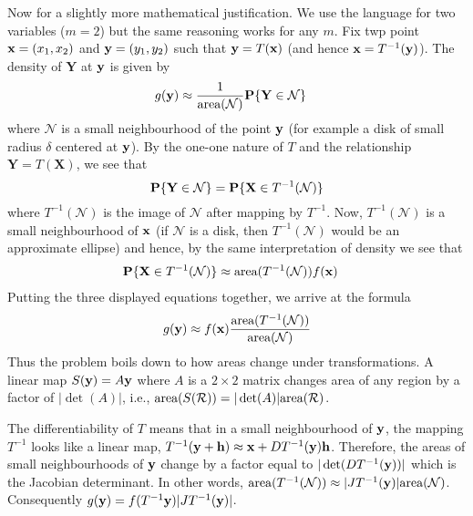 \documentclass[preprint,  11pt]{amsart}
\def\h{{\bf h}}
\def\X{\mathbf{X}}
\def\Y{\mathbf{Y}}
\begin{document}
Now for a slightly more mathematical justification. We use the language for two variables ($m=2$) but the same reasoning works for any $m$. Fix twp point $\mathbf{x}=(x_{1},x_{2})$ and $\mathbf{y}=(y_{1},y_{2})$ such that $\mathbf{y}=T(\mathbf{x})$ (and hence $\mathbf{x}=T^{-1}(\mathbf{y})$). The density of $\Y$ at $\mathbf{y}$ is given by
\begin{align*}
g(\y)&\approx \frac{1}{\mb{area}(\mathcal N)}\P\{\Y\in \mathcal N\}
\end{align*}
where $\mathcal N$ is a small neighbourhood of the point $\mathbf{y}$ (for example a disk of small radius $\delta$ centered at $\mathbf{y}$). By the one-one nature of $T$ and the relationship $\Y=T(\X)$, we see that $$\P\{\Y\in \mathcal N\}=\P\{\X\in T^{-1}(\mathcal N)\}$$ where $T^{-1}(\mathcal N)$ is the image of $\mathcal N$ after mapping by $T^{-1}$.  Now, $T^{-1}(\mathcal N)$ is a small neighbourhood of $\mathbf{x}$ (if $\mathcal N$ is a disk, then $T^{-1}(\mathcal N)$ would be an approximate ellipse) and hence, by the same interpretation of density we see that
\begin{align*}
\P\{\X\in T^{-1}(\mathcal N)\}&\approx \mb{area}(T^{-1}(\mathcal N))f(\x)
\end{align*}
Putting the three displayed equations together, we arrive at the formula
$$
g(\mathbf{y})\approx f(\mathbf{x})\frac{\mbox{area}(T^{-1}(\mathcal N))}{\mbox{area}(\mathcal N)}
$$
Thus the problem boils down to how areas change under transformations. A linear map $S(\mathbf{y})=A\mathbf{y}$ where $A$ is a $2\times 2$ matrix changes area of any region by a factor of $|\det(A)|$, i.e., $\mbox{area}(S(\mathcal R))=|\det(A)|\mbox{area}(\mathcal R)$.

The differentiability of $T$ means that in a small neighbourhood of $\mathbf{y}$, the mapping $T^{-1}$ looks like a linear map, $T^{-1}(\y+\mathbf h)\approx \x+DT^{-1}(\y)\h$. Therefore, the areas of small neighbourhoods of $\mathbf{y}$ change by a factor equal to $|\det(DT^{-1}(\mathbf{y}))|$ which is the Jacobian determinant. In other words, $\mbox{area}(T^{-1}(\mathcal N))\approx |JT^{-1}(\mathbf{y})|\mbox{area}(\mathcal N)$. Consequently $g(\mathbf{y})=f(T^{-1}\mathbf{y})|JT^{-1}(\mathbf{y})|$.
\end{document}
